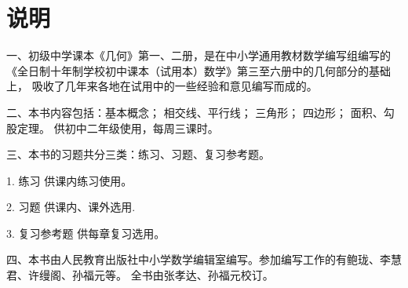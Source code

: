 
\chapter{说明}

一、初级中学课本《几何》第一、二册，是在中小学通用教材数学编写组编写的
《全日制十年制学校初中课本（试用本）数学》第三至六册中的几何部分的基础上，
吸收了几年来各地在试用中的一些经验和意见编写而成的。

二、本书内容包括：基本概念； 相交线、平行线； 三角形； 四边形； 面积、勾股定理。
供初中二年级使用，每周三课时。

三、本书的习题共分三类：练习、习题、复习参考题。

1. 练习 \quad 供课内练习使用。

2. 习题 \quad 供课内、课外选用.

3. 复习参考题 \quad 供每章复习选用。

四、本书由人民教育出版社中小学数学编辑室编写。参加编写工作的有鲍珑、李慧君、许缦阁、孙福元等。
全书由张孝达、孙福元校订。

